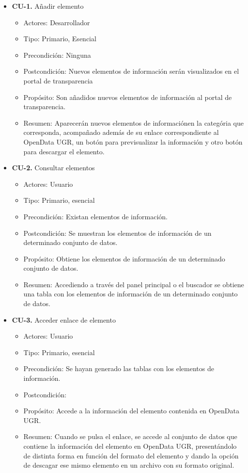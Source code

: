 \begin{itemize}
 \item \textbf{CU-1.} Añadir elemento
 \begin{itemize}
  \item Actores: Desarrollador
  \item Tipo: Primario, Esencial
  \item Precondición: Ninguna
  \item Postcondición: Nuevos elementos de información serán visualizados en el portal de transparencia
  \item Propósito: Son añadidos nuevos elementos de información al portal de transparencia.
  \item Resumen: Aparecerán nuevos elementos de informaciónen la categória que corresponda, acompañado además de su enlace
  correspondiente al OpenData UGR, un botón para previsualizar la información y otro botón para descargar el elemento.
 \end{itemize}
\end{itemize}

\newpage
\begin{itemize}
 \item \textbf{CU-2.} Consultar elementos
 \begin{itemize}
  \item Actores: Usuario
  \item Tipo: Primario, esencial
  \item Precondición: Existan elementos de información.
  \item Postcondición: Se muestran los elementos de información de un determinado conjunto de datos.
  \item Propósito: Obtiene los elementos de información de un determinado conjunto de datos.
  \item Resumen: Accediendo a través del panel principal o el buscador se obtiene una tabla con los elementos de información
  de un determinado conjunto de datos.
 \end{itemize}
\end{itemize}

\begin{itemize}
 \item \textbf{CU-3.} Acceder enlace de elemento
 \begin{itemize}
  \item Actores: Usuario
  \item Tipo: Primario, esencial
  \item Precondición: Se hayan generado las tablas con los elementos de información.
  \item Postcondición: 
  \item Propósito: Accede a la información del elemento contenida en OpenData UGR.
  \item Resumen: Cuando se pulsa el enlace, se accede al conjunto de datos que contiene la información del elemento en OpenData
  UGR, presentándolo de distinta forma en función del formato del elemento y dando la opción de descagar ese mismo elemento en 
  un archivo con su formato original.
 \end{itemize}
\end{itemize}

